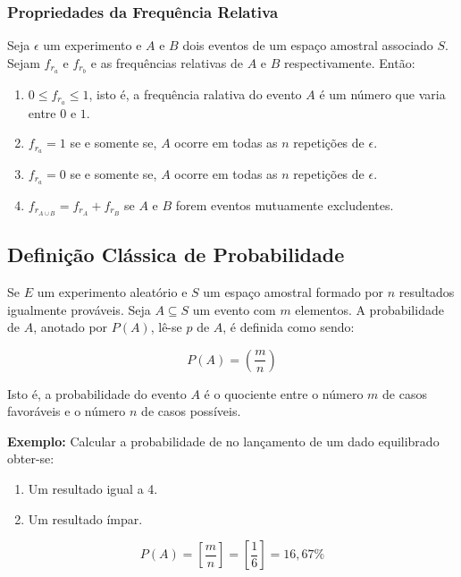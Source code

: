  
\newpage 
\subsubsection{Propriedades da Frequência Relativa} 

Seja $\epsilon$ um experimento e $A$ e $B$ dois eventos de um espaço amostral associado $S$. Sejam $f_{r_{a}}$ e $f_{r_{b}}$ e as frequências relativas de $A$ e $B$ respectivamente. Então:

\begin{enumerate}
    \item $0 \leqslant f_{r_{a}}  \leqslant 1$, isto é, a frequência ralativa do evento $A$ é um número que varia entre $0$ e $1$.
    \item $f_{r_{a}}= 1$ se e somente se, $A$ ocorre em todas as $n$ repetições de $\epsilon$.
    \item $f_{r_{a}}= 0$ se e somente se, $A$ ocorre em todas as $n$ repetições de $\epsilon$.
    \item $f_{r_{A \cup B}}  = f_{r_{A}} + f_{r_{B}}$ se $A$ e $B$ forem eventos mutuamente excludentes.
\end{enumerate}
 
 
\subsection{Definição Clássica de Probabilidade}
 
Se $E$ um experimento aleatório e $S$ um espaço amostral formado por $n$ resultados igualmente prováveis. Seja $A \subseteq S$ um evento com $m$ elementos. A probabilidade de $A$, anotado por $P(A)$, lê-se $p$ de $A$, é definida como sendo:
  
\begin{equation}
     P(A)= \left( \frac{m}{n} \right)
\end{equation}
  
Isto é, a probabilidade do evento $A$ é o quociente entre o número $m$ de casos favoráveis e o número $n$ de casos possíveis.\vskip0.3cm


\textbf{Exemplo:} Calcular a probabilidade de no lançamento de um
dado equilibrado obter-se:

\begin{enumerate}
    \item Um resultado igual a 4.
    \item Um resultado ímpar.
\end{enumerate}

$$
P(A)= \left[ \frac{m}{n} \right] = \left[  \frac{1}{6} \right] = 16,67\% 
$$


